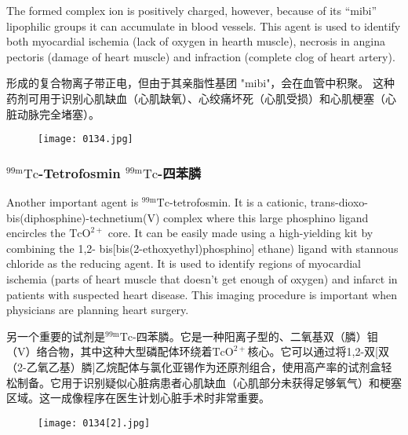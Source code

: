 \documentclass[dvipsnames, svgnames,a4paper,11pt]{article}
\begin{document}
The formed complex ion is positively charged, however, because of its “mibi”
lipophilic groups it can accumulate in blood vessels. This agent is used to identify
both myocardial ischemia (lack of oxygen in hearth muscle), necrosis in angina
pectoris (damage of heart muscle) and infraction (complete clog of heart artery).

形成的复合物离子带正电，但由于其亲脂性基团 "mibi"，会在血管中积聚。 这种药剂可用于识别心肌缺血（心肌缺氧）、心绞痛坏死（心肌受损）和心肌梗塞（心脏动脉完全堵塞）。

\begin{figure}[h]
	\centering
    \texttt{[image: 0134.jpg]}    
     \label{fig135}
\end{figure}

\subsubsection{${}^\mathrm{99m}\mathrm{Tc}$-Tetrofosmin ${}^\mathrm{99m}\mathrm{Tc}$-四苯膦}

Another important agent is ${}^\mathrm{99m}\mathrm{Tc}$-tetrofosmin. It is a cationic, trans-dioxo-
bis(diphosphine)-technetium(V) complex where this large phosphino ligand encircles
the $\mathrm{TcO^{2+}}$ core. It can be easily made using a high-yielding kit by combining the 1,2-
bis[bis(2-ethoxyethyl)phosphino] ethane) ligand with stannous chloride as the
reducing agent. It is used to identify regions of myocardial ischemia (parts of heart
muscle that doesn't get enough of oxygen) and infarct in patients with suspected
heart disease. This imaging procedure is important when physicians are planning
heart surgery.

 另一个重要的试剂是${}^\mathrm{99m}\mathrm{Tc}$-四苯膦。它是一种阳离子型的、二氧基双（膦）钼（V）络合物，其中这种大型磷配体环绕着$\mathrm{TcO^{2+}}$核心。它可以通过将1,2-双[双（2-乙氧乙基）膦]乙烷配体与氯化亚锡作为还原剂组合，使用高产率的试剂盒轻松制备。它用于识别疑似心脏病患者心肌缺血（心肌部分未获得足够氧气）和梗塞区域。这一成像程序在医生计划心脏手术时非常重要。

 \begin{figure}[h]
	\centering
    \texttt{[image: 0134[2].jpg]}    
     \label{fig136}
\end{figure}
\end{document}
